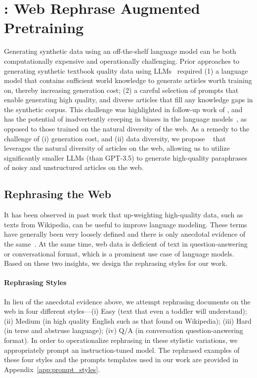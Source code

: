 \section{\ours: Web Rephrase Augmented Pretraining}
Generating synthetic data using an off-the-shelf language model can be both computationally expensive and operationally challenging. Prior approaches to generating synthetic textbook quality data using LLMs~\citep{gunasekar2023textbooks} required (1) a language model that contains sufficient world knowledge to generate articles worth training on, thereby increasing generation cost; (2) a careful selection of prompts that enable generating high quality, and diverse articles that fill any knowledge gaps in the synthetic corpus. This challenge was highlighted in follow-up work of \citet{li2023textbooks}, and has the potential of inadvertently creeping in biases in the language models~\citep{maini_phi_1_5}, as opposed to those trained on the natural diversity of the web.
As a remedy to the challenge of (i) generation cost, and (ii) data diversity, we propose \ours~ that leverages the natural diversity of articles on the web, allowing us to utilize significantly smaller LLMs (than GPT-3.5) to generate high-quality paraphrases of noisy and unstructured articles on the web.

\subsection{Rephrasing the Web}
\label{sec:synthetic_data_generation}
It has been observed in past work that up-weighting high-quality data, such as texts from Wikipedia, can be useful to improve language modeling. These terms have generally been very loosely defined and there is only anecdotal evidence of the same~\citep{brown2020language,wenzek-etal-2020-ccnet}. At the same time, web data is deficient of text in question-answering or conversational format, which is a prominent use case of language models. Based on these two insights, we design the rephrasing styles for our work.

\paragraph{Rephrasing Styles}
In lieu of the anecdotal evidence above, we attempt rephrasing documents on the web in four different styles---(i) Easy (text that even a toddler will understand); (ii) Medium (in high quality English such as that found on Wikipedia); (iii) Hard (in terse and abstruse language); (iv) Q/A (in conversation question-answering format). In order to operationalize rephrasing in these stylistic variations, we appropriately prompt an instruction-tuned model. The rephrased examples of these four styles and the prompts templates used in our work are provided in Appendix~\ref{app:prompt_styles}.

